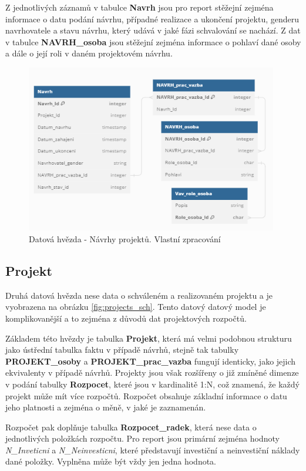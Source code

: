 \documentclass[
  digital,     %
  twoside,     %
  lof,         %
  lot,         %
]{fithesis4}
\begin{document}
Z jednotlivých záznamů v tabulce \textbf{Navrh} jsou pro report stěžejní zejména informace o datu podání návrhu, případné realizace a ukončení projektu, genderu navrhovatele a stavu návrhu, který udává v jaké fázi schvalování se nachází. Z dat v tabulce \textbf{NAVRH\_osoba} jsou stěžejní zejména informace o pohlaví dané osoby a dále o její roli v daném projektovém návrhu.
    \begin{figure}[t]
        \begin{center}
            \includegraphics[width=11cm]{img/draft_sch.png}
        \end{center}
        \caption{Datová hvězda - Návrhy projektů. Vlastní zpracování}
        \label{fig:draft_sch}
    \end{figure} 
    
\subsection{Projekt}
Druhá datová hvězda nese data o schváleném a realizovaném projektu a je vyobrazena na obrázku \ref{fig:projects_sch}. Tento datový datový model je komplikovanější a to zejména z důvodů dat projektových rozpočtů.

Základem této hvězdy je tabulka \textbf{Projekt}, která má velmi podobnou strukturu jako ústřední tabulka faktu v případě návrhů, stejně tak tabulky \textbf{PROJEKT\_osoby} a \textbf{PROJEKT\_prac\_vazba} fungují identicky, jako jejich ekvivalenty v případě návrhů. Projekty jsou však rozšířeny o již zmíněné dimenze v podání tabulky \textbf{Rozpocet}, které jsou v kardinalitě 1:N, což znamená, že každý projekt může mít více rozpočtů. Rozpočet obsahuje základní informace o datu jeho platnosti a zejména o měně, v jaké je zaznamenán.

Rozpočet pak doplňuje tabulka \textbf{Rozpocet\_radek}, která nese data o jednotlivých položkách rozpočtu. Pro report jsou primární zejména hodnoty \textit{N\_Inveticni} a \textit{N\_Neinvesticni}, které představují investiční a neinvestiční náklady dané položky. Vyplněna může být vždy jen jedna hodnota.
\end{document}
